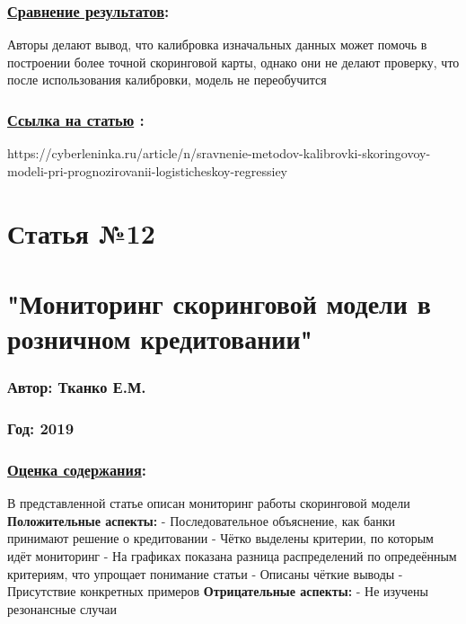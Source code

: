 \documentclass[a4paper,14pt]{article}
\begin{document}
\subsubsection*{\underline{Сравнение результатов}:}
Авторы делают вывод, что калибровка изначальных данных может помочь в построении более точной скоринговой карты, однако они не делают проверку, что после использования калибровки, модель не переобучится
\subsubsection*{\underline{Ссылка на статью} :}
https://cyberleninka.ru/article/n/sravnenie-metodov-kalibrovki-skoringovoy-modeli-pri-prognozirovanii-logisticheskoy-regressiey


\newpage



\section*{Статья №12}
\section*{"Мониторинг скоринговой модели в розничном кредитовании"}
\subsubsection*{Автор: Тканко Е.М.}
\subsubsection*{Год: 2019}
\subsubsection*{\underline{Оценка содержания}:}
В представленной статье описан мониторинг работы скоринговой модели \newline
\textbf{Положительные аспекты:} \newline
- Последовательное объяснение, как банки принимают решение о кредитовании \newline
- Чётко выделены критерии, по которым идёт мониторинг \newline
- На графиках показана разница распределений по опредеённым критериям, что упрощает понимание статьи \newline
- Описаны чёткие выводы \newline
- Присутствие конкретных примеров\newline
\textbf{Отрицательные аспекты:} \newline
- Не изучены резонансные случаи \newline
\end{document}

